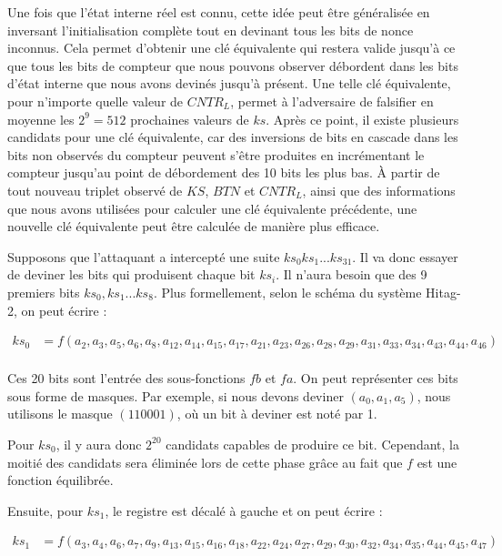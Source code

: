 \documentclass{template}
\begin{document}
Une fois que l'état interne réel est connu, cette idée peut être généralisée en inversant l'initialisation complète tout en devinant tous les bits de nonce inconnus. Cela permet d'obtenir une clé équivalente qui restera valide jusqu'à ce que tous les bits de compteur que nous pouvons observer débordent dans les bits d'état interne que nous avons devinés jusqu'à présent. Une telle clé équivalente, pour n'importe quelle valeur de $CNTR_L$, permet à l'adversaire de falsifier en moyenne les $2^9 = 512$ prochaines valeurs de $ks$. Après ce point, il existe plusieurs candidats pour une clé équivalente, car des inversions de bits en cascade dans les bits non observés du compteur peuvent s'être produites en incrémentant le compteur jusqu'au point de débordement des 10 bits les plus bas. À partir de tout nouveau triplet observé de $KS$, $BTN$ et $CNTR_L$, ainsi que des informations que nous avons utilisées pour calculer une clé équivalente précédente, une nouvelle clé équivalente peut être calculée de manière plus efficace.

Supposons que l'attaquant a intercepté une suite $ks_0ks_1...ks_{31}$. Il va donc essayer de deviner les bits qui produisent chaque bit $ks_i$. Il n'aura besoin que des 9 premiers bits $ks_0, ks_1...ks_8$. Plus formellement, selon le schéma du système Hitag-2, on peut écrire :

\begin{align*}
ks_0 &= f(a_2, a_3, a_5, a_6, a_8, a_{12}, a_{14}, a_{15}, a_{17}, a_{21}, a_{23}, a_{26}, a_{28}, a_{29}, a_{31}, a_{33}, a_{34}, a_{43}, a_{44}, a_{46}) \\
\end{align*}

Ces 20 bits sont l'entrée des sous-fonctions $fb$ et $fa$. On peut représenter ces bits sous forme de masques. Par exemple, si nous devons deviner $(a_0, a_1, a_5)$, nous utilisons le masque $(110001)$, où un bit à deviner est noté par 1.

Pour $ks_0$, il y aura donc $2^{20}$ candidats capables de produire ce bit. Cependant, la moitié des candidats sera éliminée lors de cette phase grâce au fait que $f$ est une fonction équilibrée.

Ensuite, pour $ks_1$, le registre est décalé à gauche et on peut écrire :

\begin{align*}
ks_1 &= f (a_3, a_4, a_6, a_7, a_9, a_{13}, a_{15}, a_{16}, a_{18}, a_{22}, a_{24}, a_{27}, a_{29}, a_{30}, a_{32}, a_{34}, a_{35}, a_{44}, a_{45}, a_{47}) \\
\end{align*}
\end{document}
